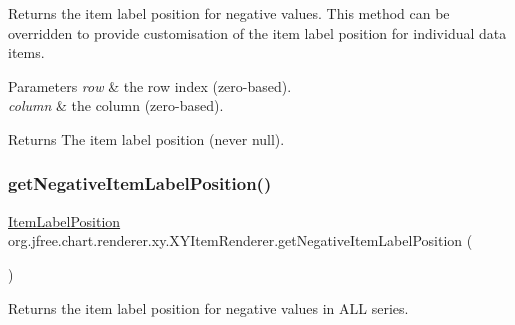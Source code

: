 Returns the item label position for negative values. This method can be overridden to provide customisation of the item label position for individual data items.


\begin{DoxyParams}{Parameters}
{\em row} & the row index (zero-\/based). \\
\hline
{\em column} & the column (zero-\/based).\\
\hline
\end{DoxyParams}
\begin{DoxyReturn}{Returns}
The item label position (never {\ttfamily null}). 
\end{DoxyReturn}
\mbox{\label{interfaceorg_1_1jfree_1_1chart_1_1renderer_1_1xy_1_1_x_y_item_renderer_a31f2fac0ed8950f1958c7d7ec6dc1345}} 
\subsubsection{\texorpdfstring{get\+Negative\+Item\+Label\+Position()}{getNegativeItemLabelPosition()}\hspace{0.1cm}{\footnotesize\ttfamily [2/2]}}
{\footnotesize\ttfamily \mbox{\hyperlink{classorg_1_1jfree_1_1chart_1_1labels_1_1_item_label_position}{Item\+Label\+Position}} org.\+jfree.\+chart.\+renderer.\+xy.\+X\+Y\+Item\+Renderer.\+get\+Negative\+Item\+Label\+Position (\begin{DoxyParamCaption}{ }\end{DoxyParamCaption})}

Returns the item label position for negative values in A\+LL series.

